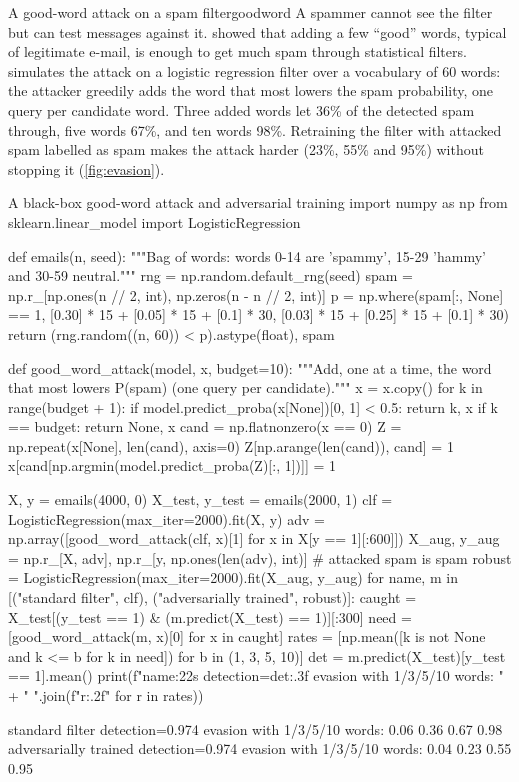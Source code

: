 \begin{example}{A good-word attack on a spam filter}{goodword}
A spammer cannot see the filter but can test messages against it. \citet{lowd2005good} showed that adding
a few ``good'' words, typical of legitimate e-mail, is enough to get much spam through statistical filters.
 simulates the attack on a logistic regression filter over a vocabulary of 60 words:
the attacker greedily adds the word that most lowers the spam probability, one query per candidate word.
Three added words let 36\% of the detected spam through, five words 67\%, and ten words 98\%. Retraining the
filter with attacked spam labelled as spam makes the attack harder (23\%, 55\% and 95\%) without stopping
it (\cref{fig:evasion}).
\end{example}

\begin{pylisting}[label={lst:goodword}]{A black-box good-word attack and adversarial training}
import numpy as np
from sklearn.linear_model import LogisticRegression

def emails(n, seed):
    """Bag of words: words 0-14 are 'spammy', 15-29 'hammy' and 30-59 neutral."""
    rng = np.random.default_rng(seed)
    spam = np.r_[np.ones(n // 2, int), np.zeros(n - n // 2, int)]
    p = np.where(spam[:, None] == 1, [0.30] * 15 + [0.05] * 15 + [0.1] * 30,
                 [0.03] * 15 + [0.25] * 15 + [0.1] * 30)
    return (rng.random((n, 60)) < p).astype(float), spam

def good_word_attack(model, x, budget=10):
    """Add, one at a time, the word that most lowers P(spam) (one query per candidate)."""
    x = x.copy()
    for k in range(budget + 1):
        if model.predict_proba(x[None])[0, 1] < 0.5:
            return k, x
        if k == budget:
            return None, x
        cand = np.flatnonzero(x == 0)
        Z = np.repeat(x[None], len(cand), axis=0)
        Z[np.arange(len(cand)), cand] = 1
        x[cand[np.argmin(model.predict_proba(Z)[:, 1])]] = 1

X, y = emails(4000, 0)
X_test, y_test = emails(2000, 1)
clf = LogisticRegression(max_iter=2000).fit(X, y)
adv = np.array([good_word_attack(clf, x)[1] for x in X[y == 1][:600]])
X_aug, y_aug = np.r_[X, adv], np.r_[y, np.ones(len(adv), int)]     # attacked spam is spam
robust = LogisticRegression(max_iter=2000).fit(X_aug, y_aug)
for name, m in [("standard filter", clf), ("adversarially trained", robust)]:
    caught = X_test[(y_test == 1) & (m.predict(X_test) == 1)][:300]
    need = [good_word_attack(m, x)[0] for x in caught]
    rates = [np.mean([k is not None and k <= b for k in need]) for b in (1, 3, 5, 10)]
    det = m.predict(X_test)[y_test == 1].mean()
    print(f"{name:22s} detection={det:.3f}  evasion with 1/3/5/10 words: "
          + " ".join(f"{r:.2f}" for r in rates))
\end{pylisting}
\begin{pyoutput}
standard filter        detection=0.974  evasion with 1/3/5/10 words: 0.06 0.36 0.67 0.98
adversarially trained  detection=0.974  evasion with 1/3/5/10 words: 0.04 0.23 0.55 0.95
\end{pyoutput}

